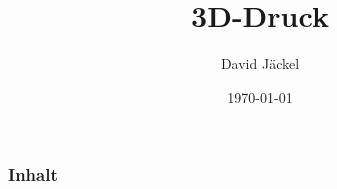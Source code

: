 \documentclass{beamer}
\title[3D-Druck]{3D-Druck}
\author{David Jäckel}
\institute[LT]{Jugend Hackt}
\date{\today}
\begin{document}
\begin{frame}
\titlepage
\end{frame}

\begin{frame}
  \frametitle{Inhalt}
  \tableofcontents
\end{frame}






\end{document}
